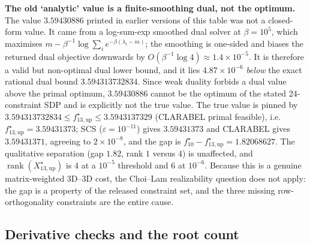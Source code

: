 \textbf{The old `analytic' value is a finite-smoothing dual, not the optimum.} The value $3.59430886$ printed in earlier versions of this table was not a closed-form value. It came from a log-sum-exp smoothed dual solver at $\beta=10^5$, which maximises $m-\beta^{-1}\log\sum_i e^{-\beta(\lambda_i-m)}$; the smoothing is one-sided and biases the returned dual objective downwards by $O(\beta^{-1}\log4)\approx1.4\times10^{-5}$. It is therefore a valid but non-optimal dual lower bound, and it lies $4.87\times10^{-6}$ \emph{below} the exact rational dual bound $3.594313732834$. Since weak duality forbids a dual value above the primal optimum, $3.59430886$ cannot be the optimum of the stated 24-constraint SDP and is explicitly not the true value. The true value is pinned by $3.594313732834\le f^\star_{13,\mathrm{up}}\le3.5943137329$ (CLARABEL primal feasible), i.e.\ $f^\star_{13,\mathrm{up}}=3.59431373$; SCS ($\varepsilon=10^{-11}$) gives $3.59431373$ and CLARABEL gives $3.59431371$, agreeing to $2\times10^{-8}$, and the gap is $f^\star_{10}-f^\star_{13,\mathrm{up}}=1.82068627$. The qualitative separation (gap $1.82$, rank $1$ versus $4$) is unaffected, and $\operatorname{rank}(X^\star_{13,\mathrm{up}})$ is $4$ at a $10^{-5}$ threshold and $6$ at $10^{-6}$. Because this is a genuine matrix-weighted 3D--3D cost, the Choi--Lam realizability question does not apply: the gap is a property of the released constraint set, and the three missing row-orthogonality constraints are the entire cause.

\subsection{Derivative checks and the root count}\label{sec:rootcount}

